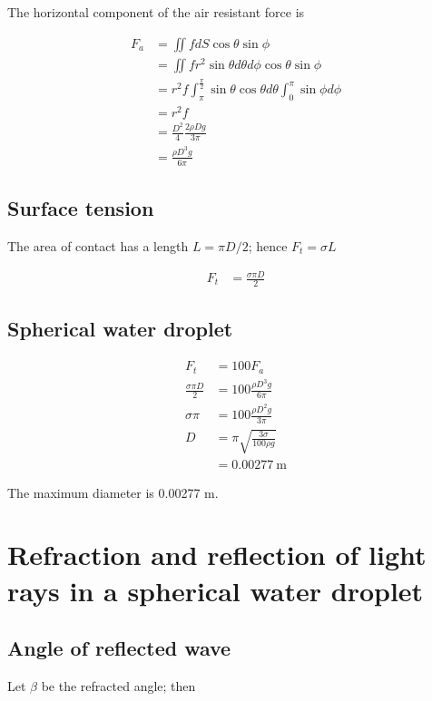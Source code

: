 \documentclass{article}
\begin{document}
The horizontal component of the air resistant force is

\begin{align*}
F_a &= \iint f dS \cos\theta \sin\phi \\
&= \iint f r^2 \sin\theta d\theta d\phi \cos\theta \sin\phi \\
&= r^2 f \int^{\frac{\pi}{2}}_\pi \sin\theta \cos\theta d\theta \int_0^\pi \sin\phi d\phi \\
&= r^2 f \\
&= \frac{D^2}{4} \frac{2 \rho D g}{3\pi} \\
&= \frac{\rho D^3 g}{6 \pi}
\end{align*}

\subsection{Surface tension}

The area of contact has a length $L = \pi D / 2$; hence $F_t = \sigma L$ 

\begin{align*}
F_t &= \frac{\sigma \pi D}{2}
\end{align*}

\subsection{Spherical water droplet}

\begin{align*}
F_t &= 100 F_a \\
\frac{\sigma \pi D}{2} &= 100 \frac{\rho D^3 g}{6 \pi} \\
\sigma \pi &= 100 \frac{\rho D^2 g}{3 \pi} \\
D &= \pi \sqrt{\frac{3 \sigma}{100 \rho g}} \\
&= 0.00277 \mathrm{\ m}
\end{align*}

The maximum diameter is 0.00277 m.

\section{Refraction and reflection of light rays in a spherical water droplet}

\subsection{Angle of reflected wave}

Let $\beta$ be the refracted angle; then
\end{document}

